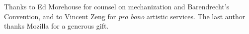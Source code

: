 Thanks to Ed Morehouse for counsel on mechanization and Barendrecht's
Convention, and to Vincent Zeng for \textit{pro bono} artistic services.
%
The last author thanks Mozilla for a generous gift.

